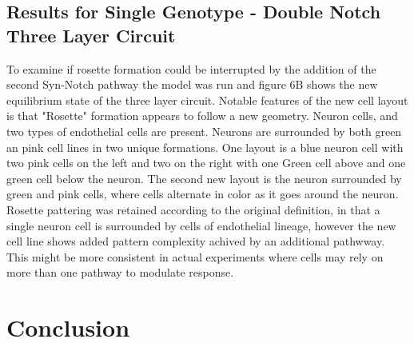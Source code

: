 \documentclass[12pt]{ifacconf}
\begin{document}
\subsection{Results for Single Genotype - Double Notch Three Layer Circuit} 

To examine if rosette formation could be interrupted by the addition of the second Syn-Notch pathway the model was run and figure 6B shows the new equilibrium state of the three layer circuit. Notable features of the new cell layout is that "Rosette" formation appears to follow a new geometry. Neuron cells, and two types of endothelial cells are present. Neurons are surrounded by both green an pink cell lines in two unique formations. One layout is a blue neuron cell with two pink cells on the left and two on the right with one Green cell above and one green cell below the neuron. The second new layout is the neuron surrounded by green and pink cells, where cells alternate in color as it goes around the neuron. Rosette pattering was retained according to the original definition, in that a single neuron cell is surrounded by cells of endothelial lineage, however the new cell line shows added pattern complexity achived by an additional pathwway. This might be more consistent in actual experiments where cells may rely on more than one pathway to modulate response.





\section{Conclusion}
\end{document}
